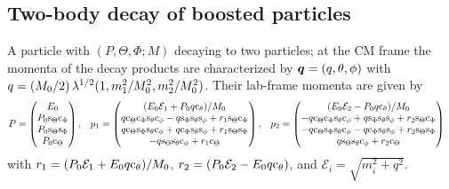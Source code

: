\documentclass[CheatSheet]{subfiles}
\begin{document}
\subsection{Two-body decay of boosted particles}
A particle with $(P, \Theta, \Phi; M)$ decaying to two particles; at the CM frame the momenta of the decay products are characterized by ${\boldsymbol{q}}=(q,\theta,\phi)$ with $q=(M_0/2)\Kallen[1/2](1,m_1^2/M_0^2,m_2^2/M_0^2)$. Their lab-frame momenta are given by
\begin{align}
 P &=
\begin{pmatrix}
  E_0\\
 {P_0} \mathrm{s}_{\Theta} \mathrm{c}_{\Phi} \\
 {P_0} \mathrm{s}_{\Theta} \mathrm{s}_{\Phi} \\
 {P_0} \mathrm{c}_{\Theta} \\
\end{pmatrix},&
 p_1&=
\begin{pmatrix}
  ({E_0 \mathcal{E}_1+P_0 q \mathrm{c}_{\theta}})/{M_0} \\
 q \mathrm{c}_{\Theta} \mathrm{c}_{\Phi} \mathrm{s}_{\theta} \mathrm{c}_{\phi} - q \mathrm{s}_{\Phi} \mathrm{s}_{\theta} \mathrm{s}_{\phi} + r_1 \mathrm{s}_{\Theta} \mathrm{c}_{\Phi} \\
 q \mathrm{c}_{\Theta} \mathrm{s}_{\Phi} \mathrm{s}_{\theta} \mathrm{c}_{\phi} + q \mathrm{c}_{\Phi} \mathrm{s}_{\theta} \mathrm{s}_{\phi}   + r_1 \mathrm{s}_{\Theta} \mathrm{s}_{\Phi} \\
 -q \mathrm{s}_{\Theta} \mathrm{s}_{\theta} \mathrm{c}_{\phi} + r_1 \mathrm{c}_{\Theta}\\
\end{pmatrix},&
p_2&=
\begin{pmatrix}
  ({E_0 \mathcal{E}_2-P_0 q \mathrm{c}_{\theta}})/{M_0} \\
 -q \mathrm{c}_{\Theta} \mathrm{c}_{\Phi} \mathrm{s}_{\theta} \mathrm{c}_{\phi} + q \mathrm{s}_{\Phi} \mathrm{s}_{\theta} \mathrm{s}_{\phi} + r_2 \mathrm{s}_{\Theta} \mathrm{c}_{\Phi} \\
 -q \mathrm{c}_{\Theta} \mathrm{s}_{\Phi} \mathrm{s}_{\theta} \mathrm{c}_{\phi} - q \mathrm{c}_{\Phi} \mathrm{s}_{\theta} \mathrm{s}_{\phi} + r_2 \mathrm{s}_{\Theta}\mathrm{s}_{\Phi}  \\
  q \mathrm{s}_{\Theta} \mathrm{s}_{\theta} \mathrm{c}_{\phi}+r_2 \mathrm{c}_{\Theta} \\
\end{pmatrix}
\end{align}
with $r_1=(P_0\mathcal{E}_1+E_0q\mathrm{c}_{\theta})/M_0$, $r_2=(P_0\mathcal{E}_2-E_0q\mathrm{c}_{\theta})$, and $\mathcal{E}_i=\sqrt{m_i^2+q^2}$.
\end{document}
